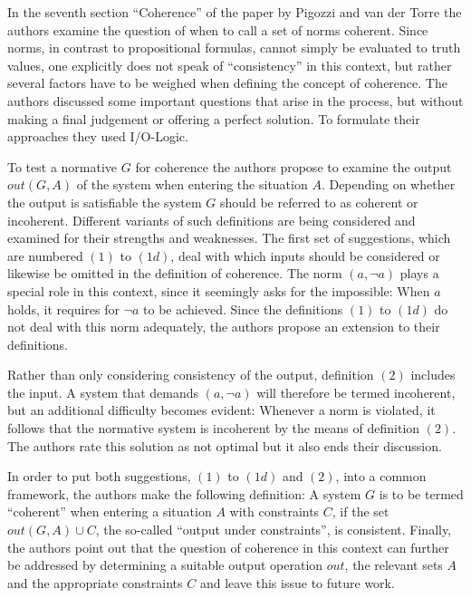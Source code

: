 \documentclass[12pt]{article}
\begin{document}
\maketitle

In the seventh section \enquote{Coherence} of the paper by Pigozzi and van der Torre \cite{pigozzi2017multiagent} the authors examine the question of when to call a set of norms coherent. Since norms, in contrast to propositional formulas, cannot  simply be evaluated to truth values, one explicitly does not speak of \enquote{consistency} in this context, but rather several factors have to be weighed when defining the concept of coherence. The authors discussed some important questions that arise in the process, but without making a final judgement or offering a perfect solution. To formulate their approaches they used I/O-Logic.

To test a normative $G$ for coherence the authors propose to examine the output $\mathit{out}(G,A)$ of the system when entering the situation $A$. Depending on whether the output is satisfiable the system $G$ should be referred to as coherent or incoherent. Different variants of such definitions are being considered and examined for their strengths and weaknesses. The first set of suggestions, which are numbered $(1)$ to $(1d)$, deal with which inputs should be considered or likewise be omitted in the definition of coherence. The norm $(a, \neg a)$ plays a special role in this context, since it seemingly asks for the impossible: When $a$ holds, it requires for $\neg a$ to be achieved. Since the definitions $(1)$ to $(1d)$ do not deal with this norm adequately, the authors propose an extension to their definitions.

Rather than only considering consistency of the output, definition $(2)$ includes the input. A system that demands $(a, \neg a)$ will therefore be termed incoherent, but an additional difficulty becomes evident: Whenever a norm is violated, it follows that the normative system is incoherent by the means of definition $(2)$. The authors rate this solution as not optimal but it also ends their discussion.

In order to put both suggestions, $(1)$ to $(1d)$ and $(2)$, into a common framework, the authors make the following definition: A system $G$ is to be termed \enquote{coherent} when entering a situation $A$ with constraints $C$, if the set $\mathit{out}(G,A) \cup C$, the so-called \enquote{output under constraints}, is consistent. Finally, the authors point out that the question of coherence in this context can further be addressed by determining a suitable output operation $\mathit{out}$, the relevant sets $A$ and the appropriate constraints $C$ and leave this issue to future work.
\end{document}
